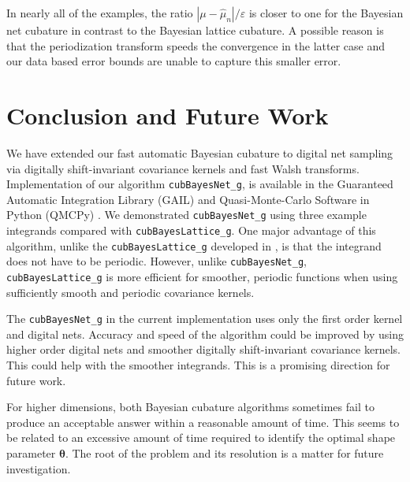 \documentclass[graybox,footinfo]{svmult}
\newcommand{\abs}[1]{\left\lvert #1 \right\rvert} %
\newcommand{\FJHNote}[1]{{\textcolor{blue}{FJH: #1}}}
\begin{document}
In nearly all of the examples, the ratio $\abs{\mu - \widehat{\mu}_n}/\varepsilon$  is closer to one for the Bayesian net cubature in contrast to the Bayesian lattice cubature.  
A possible reason is that the periodization transform speeds the convergence in the latter case and our data based error bounds are unable to capture this smaller error. 





\section{Conclusion and Future Work}
\label{FJ:sec:conclusion-future-work}

We have extended our fast automatic Bayesian cubature to digital net sampling via digitally shift-invariant covariance kernels and fast Walsh transforms.  Implementation of our algorithm \texttt{cubBayesNet\_g}, is available in the Guaranteed Automatic Integration Library (GAIL) \cite{ChoEtal21a} and Quasi-Monte-Carlo Software in Python (QMCPy) \cite{QMCPy2020a}.  We demonstrated \texttt{cubBayesNet\_g} using three example integrands compared with \texttt{cubBayesLattice\_g}. 
One major advantage of this algorithm, unlike the \texttt{cubBayesLattice\_g} developed in \cite{RatHic19a}, is that the integrand does not have to be periodic.  However, unlike \texttt{cubBayesNet\_g}, \texttt{cubBayesLattice\_g} is more efficient for smoother, periodic functions when using sufficiently smooth and periodic covariance kernels.

The \texttt{cubBayesNet\_g} in the current implementation uses only the first order kernel and digital nets. Accuracy and speed of the algorithm could be improved by using higher order digital nets and smoother digitally shift-invariant covariance kernels. This could help with the smoother integrands. This is a promising direction for future work.

For higher dimensions, both Bayesian cubature algorithms  sometimes fail to produce an acceptable answer within a reasonable amount of time.  This seems to be related to an excessive amount of time required to identify the optimal shape parameter $\boldsymbol{\theta}$.  The root of the problem and its resolution is a matter for future investigation.






\end{document}
